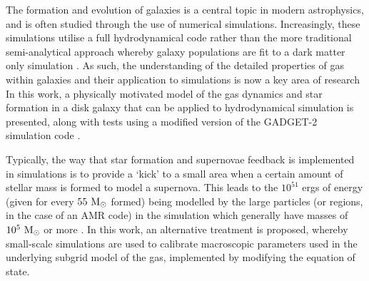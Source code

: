 The formation and evolution of galaxies is a central topic in modern astrophysics, and is often studied through the use of numerical simulations.
Increasingly, these simulations utilise a full hydrodynamical code \citep{schaye_eagle_2015,vogelsberger_introducing_2014} rather than the more traditional semi-analytical approach whereby galaxy populations are fit to a dark matter only simulation \citep{baugh_primer_2006, bower_breaking_2006}.
As such, the understanding of the detailed properties of gas within galaxies and their application to simulations is now a key area of research
In this work, a physically motivated model of the gas dynamics and star formation in a disk galaxy that can be applied to hydrodynamical simulation is presented, along with tests using a modified version of the GADGET-2 simulation code \citep{springel_cosmological_2003, springel_cosmological_2005}.

Typically, the way that star formation and supernovae feedback is implemented in simulations is to provide a `kick' to a small area when a certain amount of stellar mass is formed to model a supernova.
This leads to the $10^{51}$ ergs of energy (given for every $55 ~\mathrm{M}_{\odot}$ formed) being modelled by the large particles (or regions, in the case of an AMR code) in the simulation which generally have masses of $10^5 ~\mathrm{M}_{\odot}$ or more \citep{tasker_simulating_2006, joung_dependence_2009, hummels_adaptive_2012, hopkins_meaning_2013, becerra_interstellar_2014}.
In this work, an alternative treatment is proposed, whereby small-scale simulations are used to calibrate macroscopic parameters used in the underlying subgrid model of the gas, implemented by modifying the equation of state.
